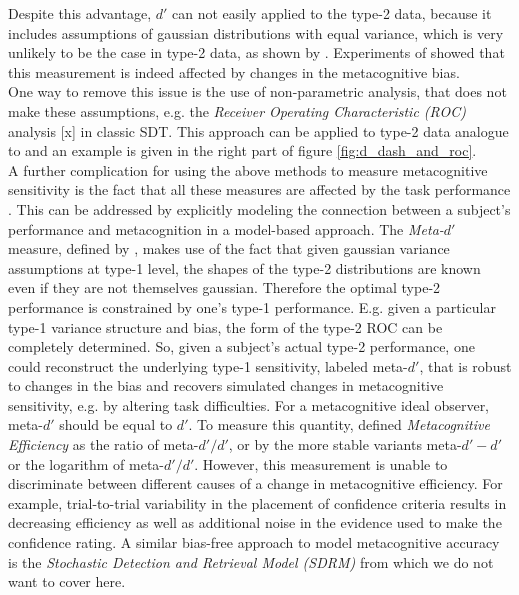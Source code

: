 \documentclass[../main/main.tex]{subfiles}
\begin{document}
	Despite this advantage, $d'$ can not easily applied to the type-2 data, because it includes assumptions of gaussian distributions with equal variance, which is very unlikely to be the case in type-2 data, as shown by \citep{galvin2003type}. Experiments of \citep{azzopardi2007evaluation} showed that this measurement is indeed affected by changes in the metacognitive bias.\\
	One way to remove this issue is the use of non-parametric analysis, that does not make these assumptions, e.g. the \textit{Receiver Operating Characteristic (ROC)} analysis [x] in classic SDT. This approach can be applied to type-2 data analogue to \citep{clarke1959two} and an example is given in the right part of figure \ref{fig:d_dash_and_roc}.\\
	A further complication for using the above methods to measure metacognitive sensitivity is the fact that all these measures are affected by the task performance \citep{galvin2003type}. This can be addressed by explicitly modeling the connection between a subject's performance and metacognition in a model-based approach. The \textit{Meta-$d'$} measure, defined by \citep{maniscalco2012signal}, makes use of the fact that given gaussian variance assumptions at type-1 level, the shapes of the type-2 distributions are known even if they are not themselves gaussian. Therefore the optimal type-2 performance is constrained by one's type-1 performance. E.g. given a particular type-1 variance structure and bias, the form of the type-2 ROC can be completely determined. So, given a subject's actual type-2 performance, one could reconstruct the underlying type-1 sensitivity, labeled meta-$d'$, that is robust to changes in the bias and recovers simulated changes in metacognitive sensitivity, e.g. by altering task difficulties. For a metacognitive ideal observer, meta-$d'$ should be equal to $d'$. To measure this quantity, \citep{fleming2014measure} defined \textit{Metacognitive Efficiency} as the ratio of meta-$d'/d'$, or by the more stable variants meta-$d'-d'$ or the logarithm of meta-$d'/d'$. However, this measurement is unable to discriminate between different causes of a change in metacognitive efficiency. For example,  trial-to-trial variability in the placement of confidence criteria results in decreasing efficiency as well as additional noise in the evidence used to make the confidence rating. A similar bias-free approach to model metacognitive accuracy is the \textit{Stochastic Detection and Retrieval Model (SDRM)} from \citep{jang2012stochastic} which we do not want to cover here.\\
\end{document}
